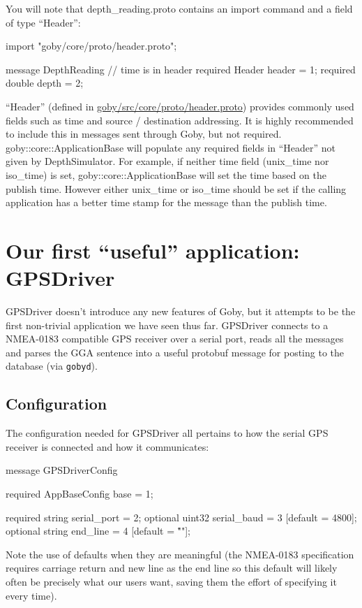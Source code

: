 \documentclass[11pt, letterpaper, oneside]{memoir}
\begin{document}
You will note that depth\_reading.proto contains an import command and a field of type ``Header'':
\begin{boxedverbatim}
import "goby/core/proto/header.proto";

message DepthReading
{
  // time is in header
  required Header header = 1;
  required double depth = 2;
}
\end{boxedverbatim}
\resetbvlinenumber

``Header'' (defined in \href{http://bazaar.launchpad.net/~goby-dev/goby/trunk/annotate/head:/src/core/proto/header.proto}{goby/src/core/proto/header.proto}) provides commonly used fields such as time and source / destination addressing. It is highly recommended to include this in messages sent through Goby, but not required. goby::core::ApplicationBase will populate any required fields in ``Header'' not given by DepthSimulator. For example, if neither time field (unix\_time nor iso\_time) is set, goby::core::ApplicationBase will set the time based on the publish time. However either unix\_time or iso\_time should be set if the calling application has a better time stamp for the message than the publish time.

\section{Our first ``useful'' application: GPSDriver}

GPSDriver doesn't introduce any new features of Goby, but it attempts to be the first non-trivial application we have seen thus far. GPSDriver connects to a NMEA-0183 compatible GPS receiver over a serial port, reads all the messages and parses the GGA sentence into a useful protobuf message for posting to the database (via \verb|gobyd|). 

\subsection{Configuration}
The configuration needed for GPSDriver all pertains to how the serial GPS receiver is connected and how it communicates:
\begin{boxedverbatim}
message GPSDriverConfig
{
  required AppBaseConfig base = 1;

  required string serial_port = 2;
  optional uint32 serial_baud = 3 [default = 4800];
  optional string end_line = 4 [default = "\r\n"];
}
\end{boxedverbatim}
\resetbvlinenumber

Note the use of defaults when they are meaningful (the NMEA-0183 specification requires carriage return and new line as the end line so this default will likely often be precisely what our users want, saving them the effort of specifying it every time).
\end{document}
